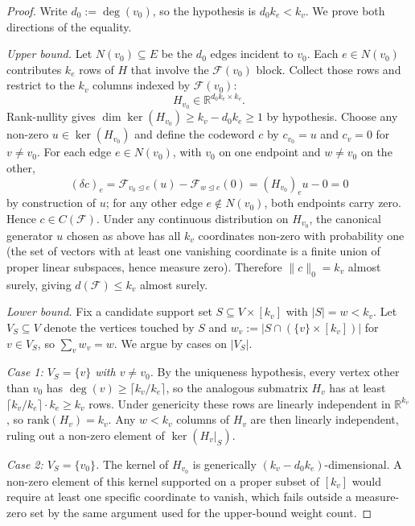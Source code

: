 \documentclass[12pt,a4paper]{article}
\theoremstyle{plain}
\theoremstyle{definition}
\begin{document}
\begin{proof}
Write $d_0 := \deg(v_0)$, so the hypothesis is $d_0 k_e < k_v$. We prove both directions of the equality.

\textit{Upper bound.} Let $N(v_0) \subseteq E$ be the $d_0$ edges incident to $v_0$. Each $e \in N(v_0)$ contributes $k_e$ rows of $H$ that involve the $\mathcal{F}(v_0)$ block. Collect those rows and restrict to the $k_v$ columns indexed by $\mathcal{F}(v_0)$:
\[
H_{v_0} \in \mathbb{R}^{d_0 k_e \times k_v}.
\]
Rank-nullity gives $\dim \ker(H_{v_0}) \geq k_v - d_0 k_e \geq 1$ by hypothesis. Choose any non-zero $u \in \ker(H_{v_0})$ and define the codeword $c$ by $c_{v_0} = u$ and $c_v = 0$ for $v \neq v_0$. For each edge $e \in N(v_0)$, with $v_0$ on one endpoint and $w \neq v_0$ on the other,
\[
(\delta c)_e = \mathcal{F}_{v_0 \trianglelefteq e}(u) - \mathcal{F}_{w \trianglelefteq e}(0) = (H_{v_0})_e u - 0 = 0
\]
by construction of $u$; for any other edge $e \notin N(v_0)$, both endpoints carry zero. Hence $c \in C(\mathcal{F})$. Under any continuous distribution on $H_{v_0}$, the canonical generator $u$ chosen as above has all $k_v$ coordinates non-zero with probability one (the set of vectors with at least one vanishing coordinate is a finite union of proper linear subspaces, hence measure zero). Therefore $\|c\|_0 = k_v$ almost surely, giving $d(\mathcal{F}) \leq k_v$ almost surely.

\textit{Lower bound.} Fix a candidate support set $S \subseteq V \times [k_v]$ with $|S| = w < k_v$. Let $V_S \subseteq V$ denote the vertices touched by $S$ and $w_v := |S \cap (\{v\} \times [k_v])|$ for $v \in V_S$, so $\sum_v w_v = w$. We argue by cases on $|V_S|$.

\textit{Case 1: $V_S = \{v\}$ with $v \neq v_0$.} By the uniqueness hypothesis, every vertex other than $v_0$ has $\deg(v) \geq \lceil k_v / k_e \rceil$, so the analogous submatrix $H_v$ has at least $\lceil k_v / k_e \rceil \cdot k_e \geq k_v$ rows. Under genericity these rows are linearly independent in $\mathbb{R}^{k_v}$, so $\mathrm{rank}(H_v) = k_v$. Any $w < k_v$ columns of $H_v$ are then linearly independent, ruling out a non-zero element of $\ker(H_v|_S)$.

\textit{Case 2: $V_S = \{v_0\}$.} The kernel of $H_{v_0}$ is generically $(k_v - d_0 k_e)$-dimensional. A non-zero element of this kernel supported on a proper subset of $[k_v]$ would require at least one specific coordinate to vanish, which fails outside a measure-zero set by the same argument used for the upper-bound weight count.


\end{proof}
\end{document}
